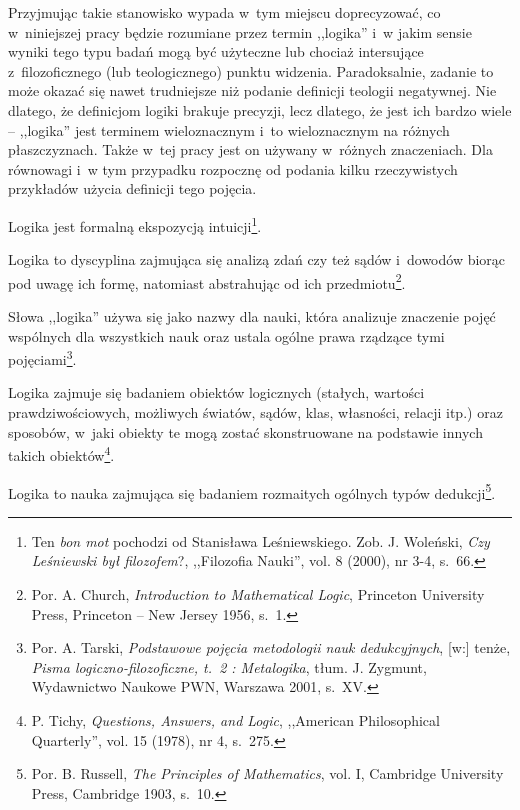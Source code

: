 Przyjmując takie stanowisko wypada w~tym miejscu doprecyzować, co w~niniejszej pracy będzie rozumiane przez termin ,,logika'' i~w jakim sensie wyniki tego typu badań mogą być użyteczne lub chociaż intersujące z~filozoficznego (lub teologicznego) punktu widzenia. Paradoksalnie, zadanie to może okazać się nawet trudniejsze niż podanie definicji teologii negatywnej. Nie dlatego, że definicjom logiki brakuje precyzji, lecz dlatego, że jest ich bardzo wiele -- ,,logika'' jest terminem wieloznacznym i~to wieloznacznym na różnych płaszczyznach. Także w~tej pracy jest on używany w~różnych znaczeniach. Dla równowagi i~w tym przypadku rozpocznę od podania kilku rzeczywistych przykładów użycia definicji tego pojęcia.


\begin{defin}
Logika jest formalną ekspozycją intuicji\footnote{Ten \textit{bon mot} pochodzi od Stanisława Leśniewskiego. Zob. J. Woleński, \textit{Czy Leśniewski był filozofem}?, ,,Filozofia Nauki'', vol. 8 (2000), nr 3-4, s.~66.}.
\end{defin}
\begin{defin}
Logika to dyscyplina zajmująca się analizą zdań czy też sądów i~dowodów biorąc pod uwagę ich formę, natomiast abstrahując od ich przedmiotu\footnote{Por. A. Church, \textit{Introduction to Mathematical Logic}, Princeton University Press, Princeton -- New Jersey 1956, s.~1.}.
\end{defin}
\begin{defin}
Słowa ,,logika'' używa się jako nazwy dla nauki, która analizuje znaczenie pojęć wspólnych dla wszystkich nauk oraz ustala ogólne prawa rządzące tymi pojęciami\footnote{Por. A. Tarski, \textit{Podstawowe pojęcia metodologii nauk dedukcyjnych}, [w:] tenże, \textit{Pisma logiczno-filozoficzne, t.~2 : Metalogika}, tłum. J. Zygmunt, Wydawnictwo Naukowe PWN, Warszawa 2001, s.~XV.}.
\end{defin}
\begin{defin}
Logika zajmuje się badaniem obiektów logicznych (stałych, wartości prawdziwościowych, możliwych światów, sądów, klas, własności, relacji itp.) oraz sposobów, w~jaki obiekty te mogą zostać skonstruowane na podstawie innych takich obiektów\footnote{P. Tichy, \textit{Questions, Answers, and Logic}, ,,American Philosophical Quarterly'', vol. 15 (1978), nr 4, s.~275.}.
\end{defin}
\begin{defin}
Logika to nauka zajmująca się badaniem rozmaitych ogólnych typów dedukcji\footnote{Por. B. Russell, \textit{The Principles of Mathematics}, vol. I, Cambridge University Press, Cambridge 1903, s.~10.}.
\end{defin}


